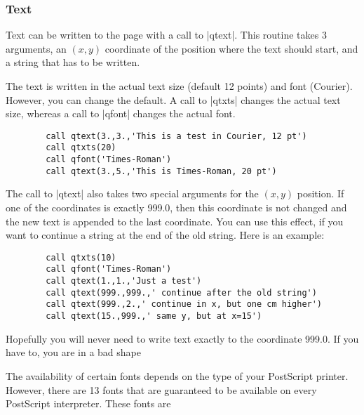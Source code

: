 \documentclass{article}
\begin{document}
\subsubsection{Text}

Text can be written to the page with a call to |qtext|. This routine
takes 3 arguments, an $(x,y)$ coordinate of the position where the text
should start, and a string that has to be written.

The text is written in the actual text size (default 12 points) and
font (Courier). However, you can change the default. A call to |qtxts|
changes the actual text size, whereas a call to |qfont| changes the
actual font.

\begin{verbatim}
        call qtext(3.,3.,'This is a test in Courier, 12 pt')
        call qtxts(20)
        call qfont('Times-Roman')
        call qtext(3.,5.,'This is Times-Roman, 20 pt')
\end{verbatim}

The call to |qtext| also takes two special arguments for the $(x,y)$
position. If one of the coordinates is exactly 999.0, then this
coordinate is not changed and the new text is appended to the last
coordinate. You can use this effect, if you want to continue a string
at the end of the old string. Here is an example:

\begin{verbatim}
        call qtxts(10)
        call qfont('Times-Roman')
        call qtext(1.,1.,'Just a test')
        call qtext(999.,999.,' continue after the old string')
        call qtext(999.,2.,' continue in x, but one cm higher')
        call qtext(15.,999.,' same y, but at x=15')
\end{verbatim}

Hopefully you will never need to write text exactly to the coordinate
999.0. If you have to, you are in a bad shape

The availability of certain fonts depends on the type of
your PostScript printer.
However, there are 13 fonts that are guaranteed to be available on
every PostScript interpreter. These fonts are
\end{document}

